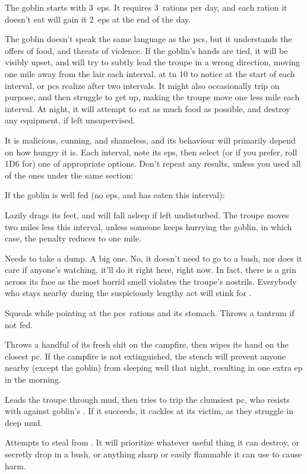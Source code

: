 \documentclass[10pt,twoside]{book}
\begin{document}
The goblin starts with 3~\glspl{ep}.
It requires 3~\glspl{ration} per day, and each \gls{ration} it doesn't eat will gain it 2~\glspl{ep} at the end of the day.

The goblin doesn't speak the same language as the \glspl{pc}, but it understands the offers of food, and threats of violence.
If the goblin's hands are tied, it will be visibly upset, and will try to subtly lead the troupe in a wrong direction, moving one mile away from the lair each \gls{interval}.
 at \gls{tn} 10 to notice at the start of each \gls{interval}, or \glspl{pc} realize after two \glspl{interval}.
It might also occasionally trip on purpose, and then struggle to get up, making the troupe move one less mile each \gls{interval}.
At night, it will attempt to eat as much food as possible, and destroy any equipment, if left unsupervised.

It is malicious, cunning, and shameless, and its behaviour will primarily depend on how hungry it is.
Each \gls{interval}, note its \glspl{ep}, then select (or if you prefer, roll 1D6 for) one of appropriate options.
Don't repeat any results, unless you used all of the ones under the same section:

If the goblin is well fed (no \glspl{ep}, and has eaten this \gls{interval}):


\begin{dlist}
  \item
  Lazily drags its feet, and will fall asleep if left undisturbed.
  The troupe moves two miles less this \gls{interval}, unless someone keeps hurrying the goblin, in which case, the penalty reduces to one mile.
  \item
  Needs to take a dump.
  A big one.
  No, it doesn't need to go to a bush, nor does it care if anyone's watching, it'll do it right here, right now.
  In fact, there is a grin across its face as the most horrid smell violates the troupe's nostrils.
  Everybody who stays nearby during the suspiciously lengthy act will stink for .
  \item
  Squeals while pointing at the \glspl{pc}~\glspl{ration} and its stomach.
  Throws a tantrum if not fed.
  \item
  Throws a handful of its fresh shit on the campfire, then wipes its hand on the closest \gls{pc}.
  If the campfire is not extinguished, the stench will prevent anyone nearby (except the goblin) from sleeping well that night, resulting in one extra \gls{ep} in the morning.
  \item
  Leads the troupe through mud, then tries to trip the clumsiest \gls{pc}, who resists with  against goblin's .
  If it succeeds, it cackles at its victim, as they struggle in deep mud.
  \item
  Attempts to steal from .
  It will prioritize whatever useful thing it can destroy, or secretly drop in a bush, or anything sharp or easily flammable it can use to cause harm.
\end{dlist}
\end{document}
